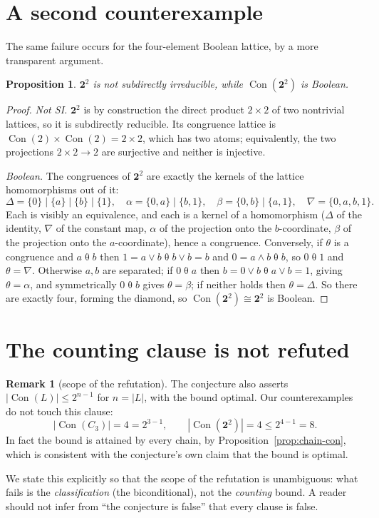 \documentclass[11pt]{article}
\newtheorem{proposition}[theorem]{Proposition}
\theoremstyle{definition}
\newtheorem{remark}[theorem]{Remark}
\newcommand{\Con}{\operatorname{Con}}
\begin{document}
\section{A second counterexample}

The same failure occurs for the four-element Boolean lattice, by a more
transparent argument.

\begin{proposition}\label{prop:22}
$\mathbf{2}^2$ is not subdirectly irreducible, while $\Con(\mathbf{2}^2)$ is
Boolean.
\end{proposition}

\begin{proof}
\emph{Not SI.} $\mathbf{2}^2$ is by construction the direct product
$2 \times 2$ of two nontrivial lattices, so it is subdirectly reducible. Its
congruence lattice is $\Con(2) \times \Con(2) = 2 \times 2$, which has two
atoms; equivalently, the two projections $2 \times 2 \to 2$ are surjective and
neither is injective.

\emph{Boolean.} The congruences of $\mathbf{2}^2$ are exactly the kernels of
the lattice homomorphisms out of it:
\[
\Delta = \{0\}\!\mid\!\{a\}\!\mid\!\{b\}\!\mid\!\{1\},\quad
\alpha = \{0,a\}\!\mid\!\{b,1\},\quad
\beta = \{0,b\}\!\mid\!\{a,1\},\quad
\nabla = \{0,a,b,1\}.
\]
Each is visibly an equivalence, and each is a kernel of a homomorphism
($\Delta$ of the identity, $\nabla$ of the constant map, $\alpha$ of the
projection onto the $b$-coordinate, $\beta$ of the projection onto the
$a$-coordinate), hence a congruence. Conversely, if $\theta$ is a congruence
and $a \mathrel{\theta} b$ then $1 = a \vee b \mathrel{\theta} b \vee b = b$
and $0 = a \wedge b \mathrel{\theta} b$, so $0 \mathrel{\theta} 1$ and
$\theta = \nabla$. Otherwise $a, b$ are separated; if $0 \mathrel{\theta} a$
then $b = 0 \vee b \mathrel{\theta} a \vee b = 1$, giving
$\theta = \alpha$, and symmetrically $0 \mathrel{\theta} b$ gives
$\theta = \beta$; if neither holds then $\theta = \Delta$. So there are exactly
four, forming the diamond, so $\Con(\mathbf{2}^2) \cong \mathbf{2}^2$ is
Boolean.
\end{proof}

\section{The counting clause is not refuted}

\begin{remark}[scope of the refutation]\label{rem:counting}
The conjecture also asserts $|\Con(L)| \le 2^{n-1}$ for $n = |L|$, with the
bound optimal. Our counterexamples do not touch this clause:
\[
|\Con(C_3)| = 4 = 2^{3-1}, \qquad |\Con(\mathbf{2}^2)| = 4 \le 2^{4-1} = 8.
\]
In fact the bound is attained by every chain, by
Proposition~\ref{prop:chain-con}, which is consistent with the conjecture's
own claim that the bound is optimal.

We state this explicitly so that the scope of the refutation is unambiguous:
what fails is the \emph{classification} (the biconditional), not the
\emph{counting} bound. A reader should not infer from ``the conjecture is
false'' that every clause is false.
\end{remark}
\end{document}
